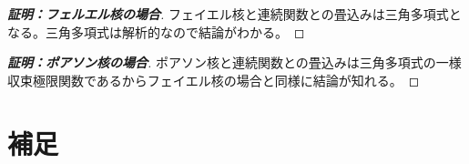 \documentclass[leqno]{jsarticle}
\begin{document}
\begin{proof}[{\bf 証明：フェルエル核の場合}]フェイエル核と連続関数との畳込みは三角多項式となる。三角多項式は解析的なので結論がわかる。

\end{proof}

\begin{proof}[{\bf 証明：ポアソン核の場合}]ポアソン核と連続関数との畳込みは三角多項式の一様収束極限関数であるからフェイエル核の場合と同様に結論が知れる。

\end{proof}

\section*{補足}
\end{document}
